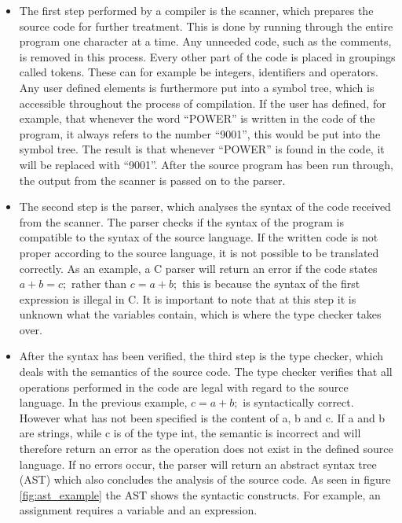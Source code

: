 \begin{itemize}
	\item The first step performed by a compiler is the scanner, which prepares the source code for further treatment. This is done by running through the entire program one character at a time. Any unneeded code, such as the comments, is removed in this process. Every other part of the code is placed in groupings called tokens. These can for example be integers, identifiers and operators. Any user defined elements is furthermore put into a symbol tree, which is accessible throughout the process of compilation. If the user has defined, for example, that whenever the word ``POWER'' is written in the code of the program, it always refers to the number ``9001'', this would be put into the symbol tree. The result is that whenever ``POWER'' is found in the code, it will be replaced with ``9001''. After the source program has been run through, the output from the scanner is passed on to the parser.
	
	\item The second step is the parser, which analyses the syntax of the code received from the scanner. The parser checks if the syntax of the program is compatible to the syntax of the source language. If the written code is not proper according to the source language, it is not possible to be translated correctly. As an example, a C parser will return an error if the code states $a + b = c;$ rather than $c = a + b;$ this is because the syntax of the first expression is illegal in C. It is important to note that at this step it is unknown what the variables contain, which is where the type checker takes over.

	\item After the syntax has been verified, the third step is the type checker, which deals with the semantics of the source code. The type checker verifies that all operations performed in the code are legal with regard to the source language. In the previous example, $c = a + b;$ is syntactically correct. However what has not been specified is the content of a, b and c. If a and b are strings, while c is of the type int, the semantic is incorrect and will therefore return an error as the operation does not exist in the defined source language. If no errors occur, the parser will return an abstract syntax tree (AST) which also concludes the analysis of the source code. As seen in figure \ref{fig:ast_example} the AST shows the syntactic constructs. For example, an assignment requires a variable and an expression. 
	

\end{itemize}
